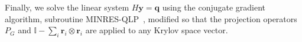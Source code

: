 \documentclass[preprint,aps,prd]{revtex4-2}
\begin{document}
Finally, we solve the linear system $H \mathbf{y} = \mathbf{q}$
using the conjugate gradient algorithm,
subroutine MINRES-QLP~\cite{choi_algorithm_2014}, modified so that
the projection operators $P_G$ and 
$\mathbb{I}- \sum_{i} \mathbf{r}_i \otimes \mathbf{r}_i$
are applied to any Krylov space vector.


\end{document}
